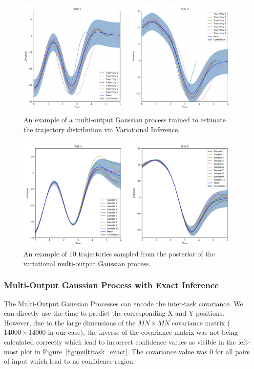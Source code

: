 \begin{figure}[t!]
    \captionsetup{font=footnotesize}
    \centering
    \includegraphics[width=\textwidth]{paper/images/VGP_RBFKernel.png}
    \caption{An example of a multi-output Gaussian process trained to estimate the trajectory distribution via Variational Inference.}
    \label{fig:multitask_approx}
    \vspace{-2em}
\end{figure}


\begin{figure}[h!]
    \captionsetup{font=footnotesize}
    \centering
    \includegraphics[width=\textwidth]{paper/images/VGP_RBF_sampling.png}
    \caption{An example of 10 trajectories sampled from the posterior of the variational multi-output Gaussian process.}
    \label{fig:multitask_sampling}
    \vspace{-2em}
\end{figure}

\subsubsection{Multi-Output Gaussian Process with Exact Inference}
The Multi-Output Gaussian Processes can encode the inter-task covariance. We can directly use the time to predict the corresponding X and Y positions. However, due to the large dimensions of the $MN \times MN$ covariance matrix ($14000\times 14000$ in our case), the inverse of the covariance matrix was not being calculated correctly which lead to incorrect confidence values as visible in the left-most plot in Figure~\ref{fig:multitask_exact}. The covariance value was 0 for all pairs of input which lead to no confidence region.


